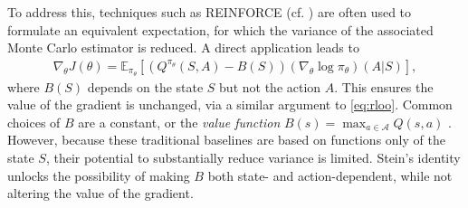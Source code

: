 \documentclass[12pt,paper=letter]{scrreprt}
\begin{document}
To address this, techniques such as REINFORCE (cf. ) are often used to formulate an equivalent expectation, for which the variance of the associated Monte Carlo estimator is reduced.
A direct application leads to
\begin{align*}
    \nabla_\theta J(\theta) = \mathbb{E}_{\pi_\theta} \left[ \left(Q^{\pi_\theta}(S, A) - B(S)\right) (\nabla_\theta \log \pi_\theta)(A|S) \right] ,
\end{align*}
where $B(S)$ depends on the state $S$ but not the action $A$.
This ensures the value of the gradient is unchanged, via a similar argument to \eqref{eq:rloo}.
Common choices of $B$ are a constant, or the \emph{value function} $B(s) = \max_{a \in \mathcal{A}} Q(s,a)$ \citep{sutton1998reinforcement}.
However, because these traditional baselines are based on functions only of the state $S$, their potential to substantially reduce variance is limited.
Stein’s identity unlocks the possibility of making $B$ both state- and action-dependent, while not altering the value of the gradient.
\end{document}
